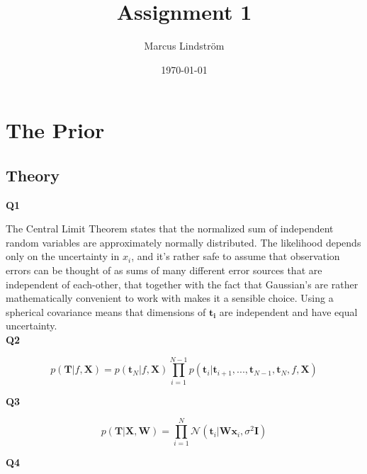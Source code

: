 \documentclass[a4paper]{article}
\title{Assignment 1}
\author{Marcus Lindström}
\date{\today}
\begin{document}
\maketitle

\section{The Prior}
\subsection{Theory}

\noindent\textbf{Q1} 

\noindent\makebox[\linewidth]{\rule{\textwidth}{0.4pt}}

\hfill

\noindent The Central Limit Theorem states that the normalized sum of independent random variables are approximately normally distributed. The likelihood depends only on the uncertainty in $x_i$, and it's rather safe to assume that observation errors can be thought of as sums of many different error sources that are independent of each-other, that together with the fact that Gaussian's are rather mathematically convenient to work with makes it a sensible choice. Using a spherical covariance means that dimensions of $\mathbf{t_i}$ are independent and have equal uncertainty.    \\

\noindent \textbf{Q2}

\noindent\makebox[\linewidth]{\rule{\textwidth}{0.4pt}}

\begin{equation*}
p(\mathbf{T}\vert f,\mathbf{X})=p(\mathbf{t}_N\vert f, \mathbf{X})\prod_{i=1}^{N-1}p(\mathbf{t}_i\vert \mathbf{t}_{i+1},...,\mathbf{t}_{N-1},\mathbf{t}_{N},f, \mathbf{X})
\end{equation*}

\hfill

\noindent \textbf{Q3}

\noindent\makebox[\linewidth]{\rule{\textwidth}{0.4pt}}

\begin{equation*}
p(\mathbf{T}\vert \mathbf{X},\mathbf{W}) = \prod_{i=1}^{N}\mathcal{N}(\mathbf{t}_i\vert \mathbf{W}\mathbf{x}_i,\sigma^2\mathbf{I})
\end{equation*}

\noindent \textbf{Q4}

\noindent\makebox[\linewidth]{\rule{\textwidth}{0.4pt}}
\end{document}
